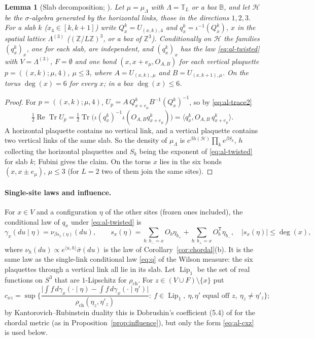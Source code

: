 \documentclass[11pt,a4paper]{article}
\theoremstyle{remark}
\theoremstyle{definition}
\theoremstyle{plain}
\newtheorem{allem}[althm]{Lemma}
\theoremstyle{remark}
\newcommand{\Z}{\mathbb{Z}}
\newcommand{\ReTr}{\operatorname{Re}\operatorname{Tr}}
\newcommand{\rch}{\rho_{\mathrm{ch}}}
\begin{document}
\begin{allem}[Slab decomposition; {\cite[(1.17)--(1.19)]{DF80}}]\label{lem:al-slab}
Let $\mu=\mu_\Lambda$ with $\Lambda=\mathbb T_L$ or a box $\mathbb B$, and let $\mathcal H$ be the $\sigma$-algebra generated by the \emph{horizontal} links, those in the directions $1,2,3$. For a slab $k$ ($x_4\in[k,k+1]$) write $Q^k_x=U_{(x,k),4}$ and $q^k_x=\iota^{-1}(Q^k_x)$, $x$ in the spatial lattice $\Lambda^{(3)}$ ($(\Z/L\Z)^3$, or a box of $\Z^3$). Conditionally on $\mathcal H$ the families $(q^k_x)_x$, one for each slab, are independent, and $(q^k_x)_x$ has the law \eqref{eq:al-twisted} with $V=\Lambda^{(3)}$, $F=\emptyset$ and one bond $(x,x+e_\mu,O_{A,B})$ for each vertical plaquette $p=((x,k);\mu,4)$, $\mu\le3$, where $A=U_{(x,k),\mu}$ and $B=U_{(x,k+1),\mu}$. On the torus $\deg(x)=6$ for every $x$; in a box $\deg(x)\le6$.
\end{allem}
\begin{proof}
For $p=((x,k);\mu,4)$, $U_p=A\,Q^k_{x+e_\mu}B^{-1}(Q^k_x)^{-1}$, so by \eqref{eq:al-trace2}
\[
\tfrac12\ReTr U_p=\tfrac12\operatorname{Tr}\big(\iota(q^k_x)^{-1}\iota(O_{A,B}q^k_{x+e_\mu})\big)=\langle q^k_x,O_{A,B}\,q^k_{x+e_\mu}\rangle .
\]
A horizontal plaquette contains no vertical link, and a vertical plaquette contains two vertical links of the same slab. So the density of $\mu_\Lambda$ is $e^{\beta h(\mathcal H)}\prod_ke^{\beta S_k}$, $h$ collecting the horizontal plaquettes and $S_k$ being the exponent of \eqref{eq:al-twisted} for slab $k$; Fubini gives the claim. On the torus $x$ lies in the six bonds $(x,x\pm e_\mu)$, $\mu\le3$ (for $L=2$ two of them join the same sites).
\end{proof}

\paragraph{Single-site laws and influence.} For $x\in V$ and a configuration $\eta$ of the other sites (frozen ones included), the conditional law of $q_x$ under \eqref{eq:al-twisted} is
\begin{equation}\label{eq:al-onesite}
\gamma_x(du\mid\eta)=\nu_{\beta s_x(\eta)}(du),\qquad s_x(\eta)=\sum_{b:\,b_-=x}O_b\eta_{b_+}+\sum_{b:\,b_+=x}O_b^{\mathsf T}\eta_{b_-},\quad|s_x(\eta)|\le\deg(x),
\end{equation}
where $\nu_h(du)\propto e^{\langle u,h\rangle}\bar\sigma(du)$ is the law of Corollary~\ref{cor:chordal}(b). It is the same law as the single-link conditional law \eqref{eq:q} of the Wilson measure: the six plaquettes through a vertical link all lie in its slab. Let $\operatorname{Lip}_1$ be the set of real functions on $S^3$ that are $1$-Lipschitz for $\rch$. For $z\in(V\cup F)\setminus\{x\}$ put
\begin{equation}\label{eq:al-cxz}
c_{xz}=\sup\Big\{\frac{\big|\int f\,d\gamma_x(\cdot\mid\eta)-\int f\,d\gamma_x(\cdot\mid\eta')\big|}{\rch(\eta_z,\eta'_z)}:\ f\in\operatorname{Lip}_1,\ \eta,\eta'\text{ equal off }z,\ \eta_z\ne\eta'_z\Big\};
\end{equation}
by Kantorovich--Rubinstein duality this is Dobrushin's coefficient (5.4) of \cite{Dob70} for the chordal metric (as in Proposition~\ref{prop:influence}), but only the form \eqref{eq:al-cxz} is used below.
\end{document}
